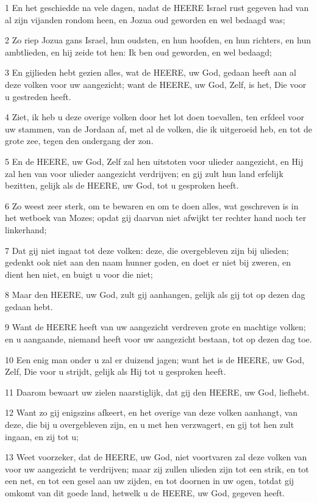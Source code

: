\par 1 En het geschiedde na vele dagen, nadat de HEERE Israel rust gegeven had van al zijn vijanden rondom heen, en Jozua oud geworden en wel bedaagd was;
\par 2 Zo riep Jozua gans Israel, hun oudsten, en hun hoofden, en hun richters, en hun ambtlieden, en hij zeide tot hen: Ik ben oud geworden, en wel bedaagd;
\par 3 En gijlieden hebt gezien alles, wat de HEERE, uw God, gedaan heeft aan al deze volken voor uw aangezicht; want de HEERE, uw God, Zelf, is het, Die voor u gestreden heeft.
\par 4 Ziet, ik heb u deze overige volken door het lot doen toevallen, ten erfdeel voor uw stammen, van de Jordaan af, met al de volken, die ik uitgeroeid heb, en tot de grote zee, tegen den ondergang der zon.
\par 5 En de HEERE, uw God, Zelf zal hen uitstoten voor ulieder aangezicht, en Hij zal hen van voor ulieder aangezicht verdrijven; en gij zult hun land erfelijk bezitten, gelijk als de HEERE, uw God, tot u gesproken heeft.
\par 6 Zo weest zeer sterk, om te bewaren en om te doen alles, wat geschreven is in het wetboek van Mozes; opdat gij daarvan niet afwijkt ter rechter hand noch ter linkerhand;
\par 7 Dat gij niet ingaat tot deze volken: deze, die overgebleven zijn bij ulieden; gedenkt ook niet aan den naam hunner goden, en doet er niet bij zweren, en dient hen niet, en buigt u voor die niet;
\par 8 Maar den HEERE, uw God, zult gij aanhangen, gelijk als gij tot op dezen dag gedaan hebt.
\par 9 Want de HEERE heeft van uw aangezicht verdreven grote en machtige volken; en u aangaande, niemand heeft voor uw aangezicht bestaan, tot op dezen dag toe.
\par 10 Een enig man onder u zal er duizend jagen; want het is de HEERE, uw God, Zelf, Die voor u strijdt, gelijk als Hij tot u gesproken heeft.
\par 11 Daarom bewaart uw zielen naarstiglijk, dat gij den HEERE, uw God, liefhebt.
\par 12 Want zo gij enigszins afkeert, en het overige van deze volken aanhangt, van deze, die bij u overgebleven zijn, en u met hen verzwagert, en gij tot hen zult ingaan, en zij tot u;
\par 13 Weet voorzeker, dat de HEERE, uw God, niet voortvaren zal deze volken van voor uw aangezicht te verdrijven; maar zij zullen ulieden zijn tot een strik, en tot een net, en tot een gesel aan uw zijden, en tot doornen in uw ogen, totdat gij omkomt van dit goede land, hetwelk u de HEERE, uw God, gegeven heeft.
